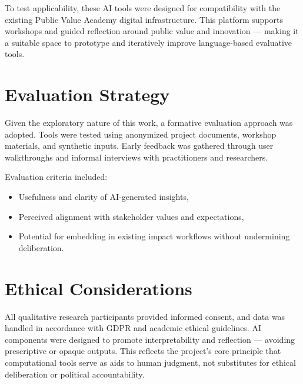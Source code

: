 To test applicability, these AI tools were designed for compatibility with the existing Public Value Academy digital infrastructure.
This platform supports workshops and guided reflection around public value and innovation — making it a suitable space to prototype and iteratively improve language-based evaluative tools.

\section{Evaluation Strategy}\label{sec:evaluation-strategy}

Given the exploratory nature of this work, a formative evaluation approach was adopted.
Tools were tested using anonymized project documents, workshop materials, and synthetic inputs.
Early feedback was gathered through user walkthroughs and informal interviews with practitioners and researchers.

Evaluation criteria included:

\begin{itemize}
    \item Usefulness and clarity of AI-generated insights,
    \item Perceived alignment with stakeholder values and expectations,
    \item Potential for embedding in existing impact workflows without undermining deliberation.
\end{itemize}

\section{Ethical Considerations}\label{sec:ethical-considerations}

All qualitative research participants provided informed consent, and data was handled in accordance with GDPR and academic ethical guidelines.
AI components were designed to promote interpretability and reflection — avoiding prescriptive or opaque outputs.
This reflects the project's core principle that computational tools serve as aids to human judgment, not substitutes for ethical deliberation or political accountability.